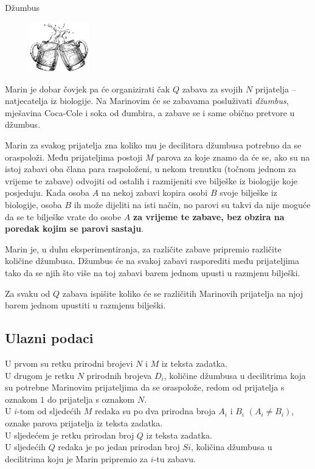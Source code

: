 \begin{statement}[
  problempoints=110,
  timelimit=1 sekunda,
  memorylimit=512 MiB,
]{Džumbus}

\setlength\intextsep{-0.1cm}
\begin{figure}
\centering
\includegraphics[width=0.23\textwidth]{img/dzumbus.png}
\end{figure}

Marin je dobar čovjek pa će organizirati čak $Q$ zabava za svojih $N$ prijatelja
-- natjecatelja iz biologije. Na Marinovim će se zabavama posluživati
\textit{džumbus}, mješavina Coca-Cole i soka od đumbira, a zabave se i same
obično pretvore u džumbus.

Marin za svakog prijatelja zna koliko mu je decilitara džumbusa potrebno da se
oraspoloži. Među prijateljima postoji $M$ parova za koje znamo da će se, ako su
na istoj zabavi oba člana para raspoloženi, u nekom trenutku (točnom jednom za
vrijeme te zabave) odvojiti od ostalih i razmijeniti sve bilješke iz biologije
koje posjeduju. Kada osoba $A$ na nekoj zabavi kopira osobi $B$ svoje bilješke
iz biologije, osoba $B$ ih može dijeliti na isti način, no parovi su takvi da
nije moguće da se te bilješke vrate do osobe $A$ \textbf{za vrijeme te zabave,
bez obzira na poredak kojim se parovi sastaju}.

Marin je, u duhu eksperimentiranja, za različite zabave pripremio različite
količine džumbusa. Džumbus će na svakoj zabavi rasporediti među prijateljima
tako da se njih što više na toj zabavi barem jednom upusti u razmjenu bilješki.

Za svaku od $Q$ zabava ispišite koliko će se različitih Marinovih prijatelja na
njoj barem jednom upustiti u razmjenu bilješki.
\subsection*{Ulazni podaci}
U prvom su retku prirodni brojevi $N$ i $M$ iz teksta zadatka. \\
U drugom je retku $N$ prirodnih brojeva $D_i$, količine džumbusa u
decilitrima koja su potrebne Marinovim prijateljima da se oraspolože, redom
od prijatelja s oznakom $1$ do prijatelja s oznakom $N$. \\
U $i$-tom od sljedećih $M$ redaka su po dva prirodna broja $A_i$ i $B_i$
$(A_i \ne B_i)$, oznake parova prijatelja iz teksta zadatka. \\
U sljedećem je retku prirodan broj $Q$ iz teksta zadatka. \\
U sljedećih $Q$ redaka je po jedan prirodan broj $Si$, količina džumbusa u
decilitrima koju je Marin pripremio za $i$-tu zabavu.



\end{statement}
